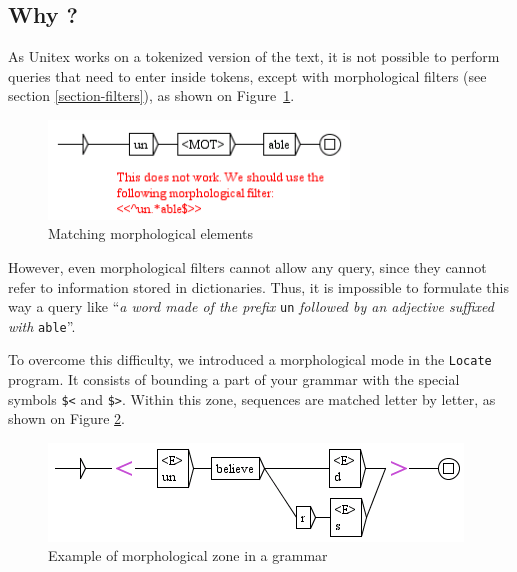 \subsection{Why ?}
As Unitex works on a tokenized version of the text, it is not possible to
perform queries that need to enter inside tokens, except with morphological
filters (see section \ref{section-filters}), as shown on Figure~\ref{fig-morpho1}.

\begin{figure}[!ht]
\begin{center}
\includegraphics[width=8cm]{resources/img/fig6-17k.png}
\caption{Matching morphological elements\label{fig-morpho1}}
\end{center}
\end{figure}

\bigskip
\noindent However, even morphological filters cannot allow any query, since they
cannot refer to information stored in dictionaries. Thus, it is impossible to formulate this way a
query like ``\textit{a word made of the prefix} \verb$un$ \textit{followed by an
adjective suffixed with} \verb+able+''.

\bigskip
\noindent To overcome this difficulty, we introduced a morphological mode in
the \verb$Locate$ program. It consists of bounding a part of your grammar with
the special symbols \verb+$<+ and \verb+$>+.\index{\verbc{$<}}\index{\verbc{$>}}
Within this zone, sequences are matched letter by letter, as shown on Figure
\ref{fig-morpho2}.

\begin{figure}[!ht]
\begin{center}
\includegraphics[width=11cm]{resources/img/fig6-17l.png}
\caption{Example of morphological zone in a grammar\label{fig-morpho2}}
\end{center}
\end{figure}

